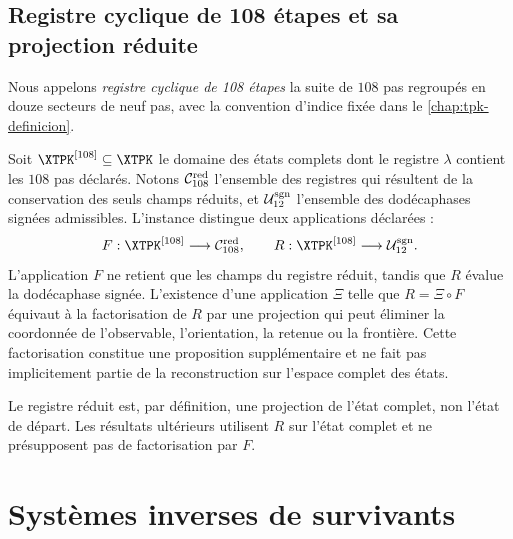 \subsection{Registre cyclique de 108 étapes et sa projection réduite}

Nous appelons \emph{registre cyclique de 108 étapes} la suite de
\(108\) pas regroupés en douze secteurs de neuf pas, avec la convention
d'indice fixée dans le \cref{chap:tpk-definicion}.

Soit \(\XTPK^{[108]}\subseteq\XTPK\) le domaine des états complets dont le
registre \(\lambda\) contient les \(108\) pas déclarés. Notons
\(\mathcal C_{108}^{\rm red}\) l'ensemble des registres qui résultent de la
conservation des seuls champs réduits, et \(\mathcal U_{12}^{\rm sgn}\)
l'ensemble des dodécaphases signées admissibles. L'instance distingue deux applications
déclarées :
\[
F:\XTPK^{[108]}\longrightarrow\mathcal C_{108}^{\rm red},
\qquad
R:\XTPK^{[108]}\longrightarrow\mathcal U_{12}^{\rm sgn}.
\]
L'application \(F\) ne retient que les champs du registre réduit, tandis que
\(R\) évalue la dodécaphase signée. L'existence d'une application \(\Xi\)
telle que \(R=\Xi\circ F\) équivaut à la factorisation de \(R\) par une
projection qui peut éliminer la coordonnée de l'observable, l'orientation,
la retenue ou la frontière. Cette factorisation constitue une proposition
supplémentaire et ne fait pas implicitement partie de la reconstruction sur l'espace
complet des états.

Le registre réduit est, par définition, une projection de l'état complet,
non l'état de départ. Les résultats ultérieurs utilisent \(R\) sur
l'état complet et ne présupposent pas de factorisation par \(F\).

\section{Systèmes inverses de survivants}

